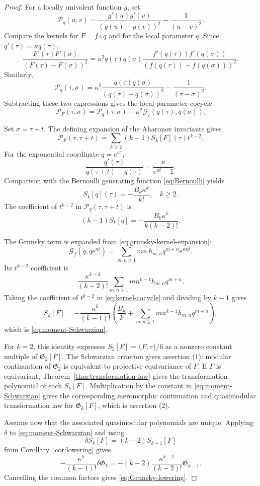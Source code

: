 \documentclass[10pt,a4paper]{amsart}
\begin{document}
\begin{proof}
For a locally univalent function $g$, set
\[
\mathcal P_g(u,v)
=
\frac{g'(u)g'(v)}{(g(u)-g(v))^2}-\frac1{(u-v)^2}.
\]
Compare the kernels for $F=f\circ q$ and for the local parameter $q$. Since $q'(\tau)=\kappa q(\tau)$,
\[
\frac{F'(\tau)F'(\sigma)}{(F(\tau)-F(\sigma))^2}
=\kappa^2q(\tau)q(\sigma)
 \frac{f'(q(\tau))f'(q(\sigma))}
 {(f(q(\tau))-f(q(\sigma)))^2}.
\]
Similarly,
\[
\mathcal P_q(\tau,\sigma)
=\kappa^2\frac{q(\tau)q(\sigma)}{(q(\tau)-q(\sigma))^2}
-\frac1{(\tau-\sigma)^2}.
\]
Subtracting these two expressions gives the local parameter cocycle
\begin{equation}\label{eq:kernel-cocycle}
\mathcal P_F(\tau,\sigma)
=
\mathcal P_q(\tau,\sigma)
-\kappa^2\mathcal G_f(q(\tau),q(\sigma)).
\end{equation}

Set $\sigma=\tau+t$. The defining expansion of the Aharonov invariants gives
\[
\mathcal P_F(\tau,\tau+t)
=\sum_{k\geq2}(k-1)S_k[F](\tau)t^{k-2}.
\]
For the exponential coordinate $q=e^{\kappa\tau}$,
\[
\frac{q'(\tau)}{q(\tau+t)-q(\tau)}
=\frac{\kappa}{e^{\kappa t}-1}.
\]
Comparison with the Bernoulli generating function \eqref{eq:Bernoulli} yields
\begin{equation*}
S_k[q](\tau)=-\frac{B_k\kappa^k}{k!},
\quad k\geq2.
\end{equation*}
The coefficient of $t^{k-2}$ in $\mathcal P_q(\tau,\tau+t)$ is
\[
(k-1)S_k[q]
=-\frac{B_k\kappa^k}{k(k-2)!}.
\]

The Grunsky term is expanded from \eqref{eq:grunsky-kernel-expansion}:
\[
\mathcal G_f(q,qe^{\kappa t})
=
\sum_{m,n\geq1}mn\,h_{m,n}q^{m+n}e^{\kappa nt}.
\]
Its $t^{k-2}$ coefficient is
\[
\frac{\kappa^{k-2}}{(k-2)!}
\sum_{m,n\geq1}m n^{k-1}h_{m,n}q^{m+n}.
\]
Taking the coefficient of $t^{k-2}$ in \eqref{eq:kernel-cocycle} and dividing by $k-1$ gives
\[
S_k[F]
=-\frac{\kappa^k}{(k-1)!}
\left(
\frac{B_k}{k}
+\sum_{m,n\geq1}m n^{k-1}h_{m,n}q^{m+n}
\right),
\]
which is \eqref{eq:moment-Schwarzian}.

For $k=2$, this identity expresses $S_2[F]=\{F,\tau\}/6$ as a nonzero constant multiple of $\mathfrak G_2[F]$. The Schwarzian criterion gives assertion (1): modular continuation of $\mathfrak G_2$ is equivalent to projective equivariance of $F$. If $F$ is equivariant, Theorem~\ref{thm:transformation-law} gives the transformation polynomial of each $S_k[F]$. Multiplication by the constant in \eqref{eq:moment-Schwarzian} gives the corresponding meromorphic continuation and quasimodular transformation law for $\mathfrak G_k[F]$, which is assertion (2).

Assume now that the associated quasimodular polynomials are unique. Applying $\delta$ to \eqref{eq:moment-Schwarzian} and using
\[
\delta S_k[F]=(k-2)S_{k-1}[F]
\]
from Corollary~\ref{cor:lowering} gives
\[
-\frac{\kappa^k}{(k-1)!}\delta\mathfrak G_k
=-(k-2)\frac{\kappa^{k-1}}{(k-2)!}\mathfrak G_{k-1}.
\]
Cancelling the common factors gives \eqref{eq:Grunsky-lowering}.
\end{proof}
\end{document}
